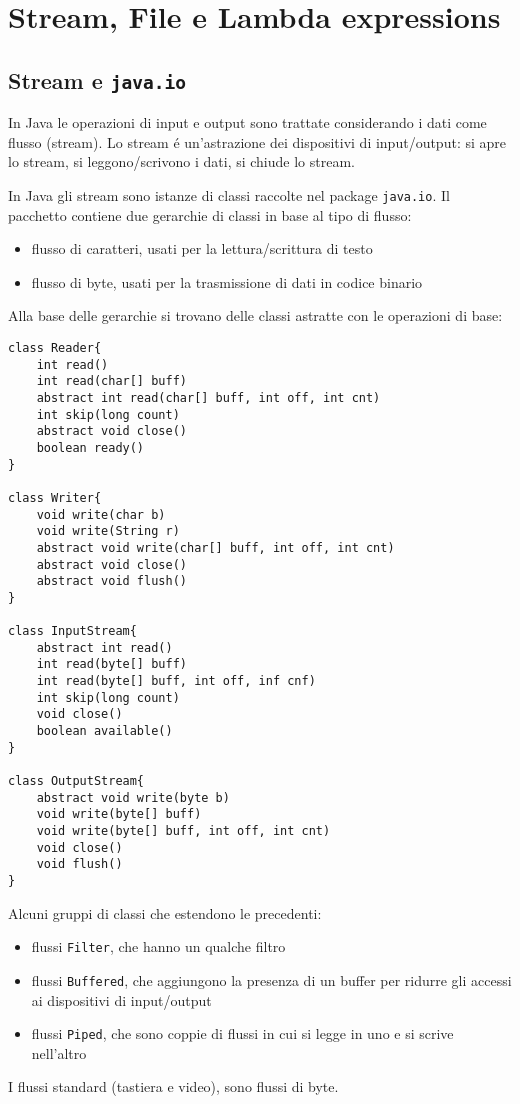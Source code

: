 \chapter{Stream, File e Lambda expressions}

\section{Stream e \texttt{java.io}}
In Java le operazioni di input e output sono trattate considerando i dati come flusso (stream). Lo stream é un'astrazione dei dispositivi di input/output: si apre lo stream, si leggono/scrivono i dati, si chiude lo stream.

In Java gli stream sono istanze di classi raccolte nel package \texttt{java.io}. Il pacchetto contiene due gerarchie di classi in base al tipo di flusso:
\begin{itemize}
 \item flusso di caratteri, usati per la lettura/scrittura di testo
 \item flusso di byte, usati per la trasmissione di dati in codice binario
\end{itemize}
Alla base delle gerarchie si trovano delle classi astratte con le operazioni di base:

\begin{lstlisting}
class Reader{
	int read()
	int read(char[] buff)
	abstract int read(char[] buff, int off, int cnt)
	int skip(long count)
	abstract void close()
	boolean ready()
}

class Writer{
	void write(char b)
	void write(String r)
	abstract void write(char[] buff, int off, int cnt)
	abstract void close()
	abstract void flush()
}

class InputStream{
	abstract int read()
	int read(byte[] buff)
	int read(byte[] buff, int off, inf cnf)
	int skip(long count)
	void close()
	boolean available()
}

class OutputStream{
	abstract void write(byte b)
	void write(byte[] buff)
	void write(byte[] buff, int off, int cnt)
	void close()
	void flush()
}
\end{lstlisting}
Alcuni gruppi di classi che estendono le precedenti:
\begin{itemize}
\item flussi \texttt{Filter}, che hanno un qualche filtro
\item flussi \texttt{Buffered}, che aggiungono la presenza di un buffer per ridurre gli accessi ai dispositivi di input/output
\item flussi \texttt{Piped}, che sono coppie di flussi in cui si legge in uno e si scrive nell'altro
\end{itemize}
I flussi standard (tastiera e video), sono flussi di byte.

